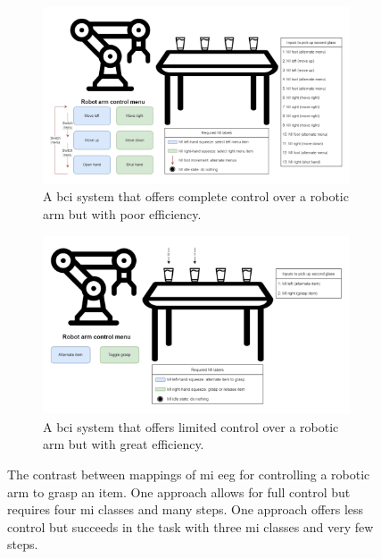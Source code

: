 \begin{figure}
    \centering
    \begin{subfigure}{\textwidth}
        \centering
        \includegraphics[width=\textwidth]{../images/introduction/example_arm_control_bad.pdf}
        \captionsetup{width=0.95\linewidth}
        \captionsetup{justification=centering}
        \caption{A \gls{bci} system that offers complete control over a robotic arm but with poor efficiency.}
        \label{fig:example_arm_control_bad}
    \end{subfigure}
    \hfill
    \begin{subfigure}{\textwidth}
        \centering
        \includegraphics[width=\textwidth]{../images/introduction/example_arm_control_good.pdf}
        \captionsetup{width=0.95\linewidth}
        \captionsetup{justification=centering}
        \caption{A \gls{bci} system that offers limited control over a robotic arm but with great efficiency. \\ \hfill}
        \label{fig:example_arm_control_good}
    \end{subfigure}
    \captionsetup{width=\linewidth}
    \captionsetup{justification=centering}
    \caption{The contrast between mappings of \gls{mi} \gls{eeg} for controlling a robotic arm to grasp an item. One approach allows for full control but requires four \gls{mi} classes and many steps. One approach offers less control but succeeds in the task with three \gls{mi} classes and very few steps.}
    \label{fig:example_arm_control}
\end{figure}



